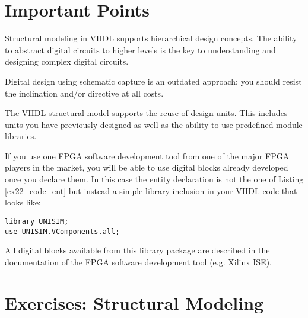 \section{Important Points}
\begin{my_list}
\item Structural modeling in VHDL supports hierarchical design concepts. The ability to abstract digital circuits to higher levels is the key to understanding and designing complex digital circuits.

\item Digital design using schematic capture is an outdated approach: you should resist the inclination and/or directive at all costs.

\item The VHDL structural model supports the reuse of design units. This includes units you have previously designed as well as the ability to use predefined module libraries.

\item If you use one FPGA software development tool from one of the major FPGA players in the market, you will be able to use digital blocks already developed once you declare them. In this case the entity declaration is not the one of Listing \ref{ex22_code_ent} but instead a simple library inclusion in your VHDL code that looks like:

\vspace*{5pt}
\noindent
\begin{minipage}{0.99\textwidth}
\texttt{library UNISIM;}\\
\texttt{use UNISIM.VComponents.all;}\\
\end{minipage}
All digital blocks available from this library package are described in the documentation of the FPGA software development tool (e.g. Xilinx ISE).
\end{my_list}

\section{Exercises: Structural Modeling}

